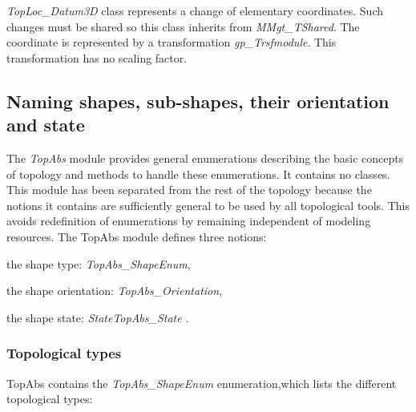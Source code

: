 {\itshape Top\+Loc\+\_\+\+Datum3D} class represents a change of elementary coordinates. Such changes must be shared so this class inherits from {\itshape M\+Mgt\+\_\+\+T\+Shared}. The coordinate is represented by a transformation {\itshape gp\+\_\+\+Trsfmodule}. This transformation has no scaling factor.\hypertarget{occt_user_guides__modeling_data_occt_modat_5_2}{}\subsection{Naming shapes, sub-\/shapes, their orientation and state}\label{occt_user_guides__modeling_data_occt_modat_5_2}
The {\itshape Top\+Abs} module provides general enumerations describing the basic concepts of topology and methods to handle these enumerations. It contains no classes. This module has been separated from the rest of the topology because the notions it contains are sufficiently general to be used by all topological tools. This avoids redefinition of enumerations by remaining independent of modeling resources. The Top\+Abs module defines three notions\+:
\begin{DoxyItemize}
\item the shape type\+: {\itshape Top\+Abs\+\_\+\+Shape\+Enum},
\item the shape orientation\+: {\itshape Top\+Abs\+\_\+\+Orientation},
\item the shape state\+: {\itshape State\+Top\+Abs\+\_\+\+State} .
\end{DoxyItemize}\hypertarget{occt_user_guides__modeling_data_occt_modat_5_2_1}{}\subsubsection{Topological types}\label{occt_user_guides__modeling_data_occt_modat_5_2_1}
Top\+Abs contains the {\itshape Top\+Abs\+\_\+\+Shape\+Enum} enumeration,which lists the different topological types\+:
